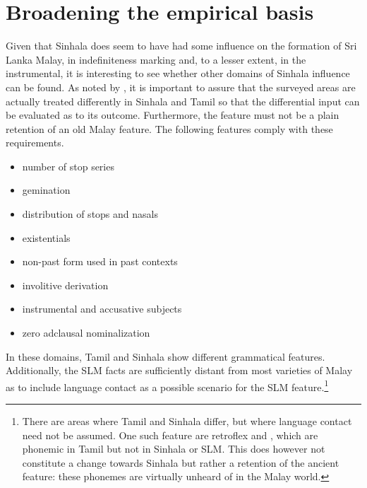 \documentclass[a4paper,10pt]{article}
\begin{document}
\newpage
\section{Broadening the empirical basis}
Given that Sinhala does seem to have had some influence on the formation of Sri Lanka Malay, in indefiniteness marking and, to a lesser extent, in the instrumental, it is interesting to see whether other domains of Sinhala influence can be found. As noted by \citet{Smith2003timing}, it is important to assure that the surveyed areas are actually treated differently in Sinhala and Tamil so that the differential input can be evaluated as to its outcome. Furthermore, the feature must not be a plain retention of an old Malay feature. The following features comply with these requirements.


\begin{itemize}
    \item number of stop series
    \item gemination
    \item distribution of stops and nasals
    \item existentials
    \item non-past form used in past contexts
    \item involitive derivation
    \item instrumental and accusative subjects
    \item zero adclausal nominalization 
\end{itemize}

In these domains, Tamil and Sinhala show different grammatical features. Additionally, the SLM facts are sufficiently distant from most varieties of Malay as to include language contact as a possible scenario for the SLM feature.\footnote{There 
 are areas where Tamil and Sinhala differ, but where language contact need not be assumed. One such feature are retroflex \lz{} and \nz{}, which are phonemic in Tamil but not in Sinhala or SLM. This does however not constitute a change towards Sinhala but rather a retention of the ancient feature: these phonemes are virtually unheard of in the Malay world.
}
\end{document}
